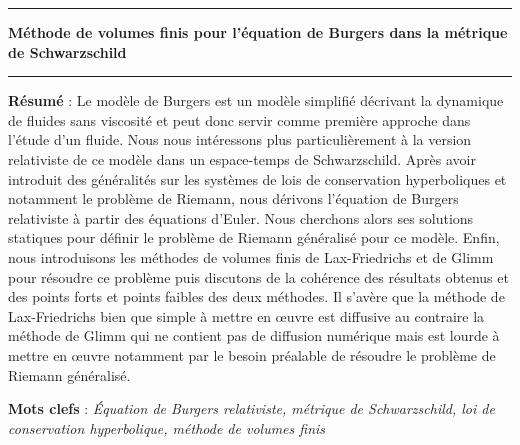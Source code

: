 \documentclass[11pt,a4paper]{article}
\begin{document}
\begin{center}

\vspace{1.5cm}

\rule[11pt]{5cm}{0.5pt}

\textbf{\huge Méthode de volumes finis pour l’équation de Burgers dans la métrique de Schwarzschild}

\rule{5cm}{0.5pt}

\vspace{1.25cm}

\parbox{15cm}{\small
\textbf{Résumé} : Le modèle de Burgers est un modèle simplifié décrivant la dynamique de fluides sans viscosité et peut donc servir comme première approche dans l'étude d'un fluide. Nous nous intéressons plus particulièrement à la version relativiste de ce modèle dans un espace-temps de Schwarzschild. Après avoir introduit des généralités sur les systèmes de lois de conservation hyperboliques et notamment le problème de Riemann, nous dérivons l'équation de Burgers relativiste à partir des équations d'Euler. Nous cherchons alors ses solutions statiques pour définir le problème de Riemann généralisé pour ce modèle. Enfin, nous introduisons les méthodes de volumes finis de Lax-Friedrichs et de Glimm pour résoudre ce problème puis discutons de la cohérence des résultats obtenus et des points forts et points faibles des deux méthodes. Il s'avère que la méthode de Lax-Friedrichs bien que simple à mettre en \oe uvre est diffusive au contraire la méthode de Glimm qui ne contient pas de diffusion numérique mais est lourde à mettre en \oe uvre notamment par le besoin préalable de résoudre le problème de Riemann généralisé.%

\vspace{0.5cm}
\rm 
} %


\vspace{0.5cm}

\parbox{15cm}{
\textbf{Mots clefs} : \it \'{E}quation de Burgers relativiste, métrique de Schwarzschild, loi de conservation hyperbolique, méthode de volumes finis
} %


\end{center}
\end{document}
